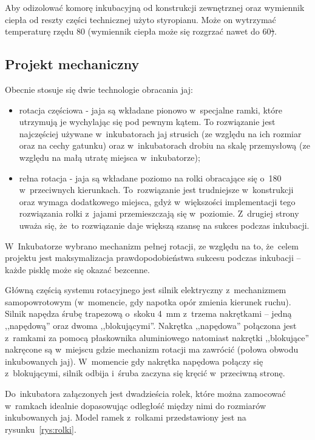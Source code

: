 Aby odizolować komorę inkubacyjną od konstrukcji zewnętrznej oraz wymiennik
ciepła od reszty części technicznej użyto styropianu. Może on wytrzymać temperaturę rzędu 80\st{} (wymiennik ciepła może
się rozgrzać nawet do 60\st).


\subsection{Projekt mechaniczny}
Obecnie stosuje się dwie technologie obracania jaj:

\begin{itemize}
\item rotacja częściowa - jaja są wkładane pionowo w~specjalne ramki, które utrzymują je
wychylając się pod pewnym kątem. To rozwiązanie jest najczęściej używane
w~inkubatorach jaj strusich (ze względu na ich rozmiar oraz na cechy gatunku)
oraz w~inkubatorach drobiu na skalę przemysłową (ze względu na małą utratę
miejsca w~inkubatorze);

\item rełna rotacja - jaja są wkładane poziomo na rolki obracające się o~180\st{} w~przeciwnych
kierunkach. To~rozwiązanie jest trudniejsze w~konstrukcji oraz wymaga
dodatkowego miejsca, gdyż w~większości implementacji tego rozwiązania rolki z~jajami
przemieszczają się w~poziomie. Z~drugiej strony uważa się, że~to rozwiązanie daje większą
szansę na sukces podczas inkubacji.
\end{itemize}
W~Inkubatorze wybrano mechanizm pełnej rotacji, ze względu na to, że~celem projektu jest
maksymalizacja prawdopodobieństwa sukcesu podczas inkubacji -- każde pisklę może
się okazać bezcenne.
 
Główną częścią systemu rotacyjnego jest silnik elektryczny z~mechanizmem
samopowrotowym (w~momencie, gdy napotka opór zmienia kierunek ruchu).
Silnik napędza śrubę trapezową o~skoku 4~mm z~trzema nakrętkami -- jedną ,,napędową''
oraz dwoma ,,blokującymi''. Nakrętka ,,napędowa'' połączona jest
z~ramkami za pomocą płaskownika aluminiowego natomiast nakrętki ,,blokujące'' 
nakręcone są w~miejscu gdzie mechanizm rotacji ma zawrócić (połowa obwodu
inkubowanych jaj). W~momencie gdy nakrętka napędowa połączy się z~blokującymi,
silnik odbija i~śruba zaczyna się kręcić w~przeciwną stronę.

Do~inkubatora załączonych jest dwadzieścia rolek, które można zamocować w~ramkach
idealnie dopasowując odległość między nimi do rozmiarów inkubowanych jaj. Model
ramek z~rolkami przedstawiony jest na rysunku~\ref{rys:rolki}.

